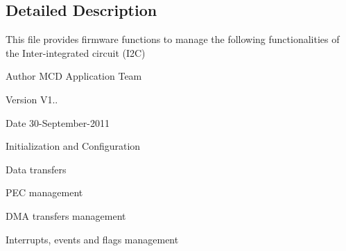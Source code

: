 \subsection{Detailed Description}
This file provides firmware functions to manage the following functionalities of the Inter-\/integrated circuit (I2C) 

\begin{DoxyAuthor}{Author}
M\+CD Application Team 
\end{DoxyAuthor}
\begin{DoxyVersion}{Version}
V1.. 
\end{DoxyVersion}
\begin{DoxyDate}{Date}
30-\/\+September-\/2011
\begin{DoxyItemize}
\item Initialization and Configuration
\item Data transfers
\item P\+EC management
\item D\+MA transfers management
\item Interrupts, events and flags management
\end{DoxyItemize}
\end{DoxyDate}
